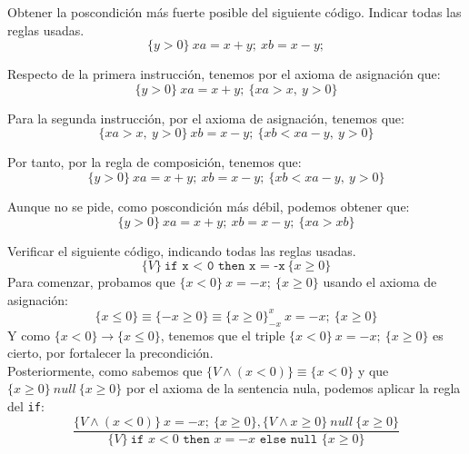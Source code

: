 \begin{ejercicio}
    Obtener la poscondición más fuerte posible del siguiente código. Indicar todas las reglas usadas.
    \begin{equation*}
        \{y>0\}\ xa=x+y;\ xb=x-y;
    \end{equation*}
    
    
    Respecto de la primera instrucción, tenemos por el axioma de asignación que:
    \begin{equation*}
        \{y>0\}\ xa=x+y;\ \{xa>x,\ y>0\}
    \end{equation*}

    Para la segunda instrucción, por el axioma de asignación, tenemos que:
    \begin{equation*}
        \{xa>x,\ y>0\}\ xb=x-y;\ \{xb<xa-y,\ y>0\}
    \end{equation*}

    Por tanto, por la regla de composición, tenemos que:
    \begin{equation*}
        \{y>0\}\ xa=x+y;\ xb=x-y;\ \{xb<xa-y,\ y>0\}
    \end{equation*}

    Aunque no se pide, como poscondición más débil, podemos obtener que:
    \begin{equation*}
        \{y>0\}\ xa=x+y;\ xb=x-y;\ \{xa>xb\}
    \end{equation*}
\end{ejercicio}

\begin{ejercicio}
    Verificar el siguiente código, indicando todas las reglas usadas.
    \begin{equation*}
        \{V\}\ \texttt{if x < 0 then x = -x}\ \{x\geq 0\}
    \end{equation*}
    Para comenzar, probamos que $\{x<0\}\ x=-x;\ \{x\geq 0\}$ usando el axioma de asignación:
    \begin{equation*}
        \{x\leq0\} \equiv \{-x\geq 0\} \equiv \{x\geq 0\}^x_{-x}\ x=-x;\ \{x\geq 0\}
    \end{equation*}
    Y como $\{x<0\}\rightarrow \{x\leq 0\}$, tenemos que el triple $\{x<0\}\ x=-x;\ \{x\geq 0\}$ es cierto, por fortalecer la precondición.\\
    Posteriormente, como sabemos que $\{V \land (x<0)\}\equiv \{x<0\}$ y que ${\{x\geq 0\}\ null\ \{x\geq 0\}}$ por el axioma de la sentencia nula, podemos aplicar la regla del \texttt{if}:
    \begin{equation*}
        \dfrac{\{V \land (x<0)\}\ x=-x;\ \{x\geq 0\}, \{V \land x\geq 0\}\ null\ \{x\geq 0\}}{\{V\}\ \texttt{if\ }x<0 \texttt{\ then\ }x=-x \texttt{\ else\ null\ } \{x\geq 0\}}
    \end{equation*}
\end{ejercicio}

